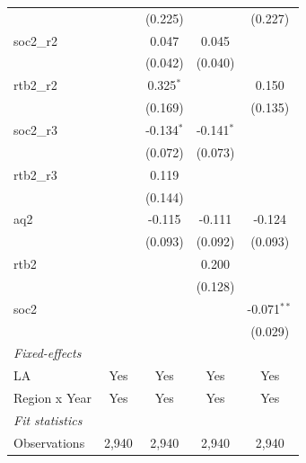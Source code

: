 \begin{table}[htbp]
\begin{tabular}{lcccc}
                                    &                & (0.225)        &                & (0.227)\\   
      soc2\_r2                      &                & 0.047          & 0.045          &   \\   
                                    &                & (0.042)        & (0.040)        &   \\   
      rtb2\_r2                      &                & 0.325$^{*}$    &                & 0.150\\   
                                    &                & (0.169)        &                & (0.135)\\   
      soc2\_r3                      &                & -0.134$^{*}$   & -0.141$^{*}$   &   \\   
                                    &                & (0.072)        & (0.073)        &   \\   
      rtb2\_r3                      &                & 0.119          &                &   \\   
                                    &                & (0.144)        &                &   \\   
      aq2                           &                & -0.115         & -0.111         & -0.124\\   
                                    &                & (0.093)        & (0.092)        & (0.093)\\   
      rtb2                          &                &                & 0.200          &   \\   
                                    &                &                & (0.128)        &   \\   
      soc2                          &                &                &                & -0.071$^{**}$\\   
                                    &                &                &                & (0.029)\\   
      \midrule
      \emph{Fixed-effects}\\
      LA                            & Yes            & Yes            & Yes            & Yes\\  
      Region x Year                 & Yes            & Yes            & Yes            & Yes\\  
      \midrule
      \emph{Fit statistics}\\
      Observations                  & 2,940          & 2,940          & 2,940          & 2,940\\  

\end{tabular}
\end{table}
